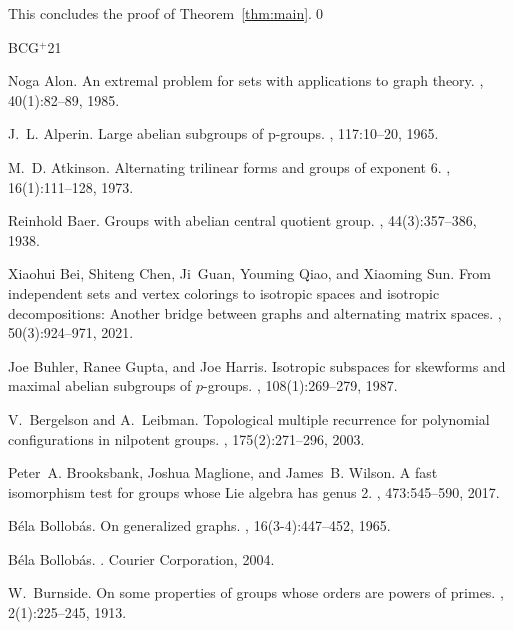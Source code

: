 \documentclass[10pt]{article}
\newcommand{\etalchar}[1]{$^{#1}$}
\begin{document}
This 
concludes the proof of Theorem~\ref{thm:main}.\hfill\qed
\begin{thebibliography}{BCG{\etalchar{+}}21}
%

Noga Alon.
\newblock An extremal problem for sets with applications to graph theory.
, 40(1):82--89, 1985.

J.~L. Alperin.
\newblock Large abelian subgroups of p-groups.
, 117:10--20,
  1965.

M.~D. Atkinson.
\newblock Alternating trilinear forms and groups of exponent 6.
, 16(1):111--128,
  1973.

Reinhold Baer.
\newblock Groups with abelian central quotient group.
,
  44(3):357--386, 1938.

\bibitem[BCG{\etalchar{+}}21]{BCG+19}
Xiaohui Bei, Shiteng Chen, Ji~Guan, Youming Qiao, and Xiaoming Sun.
\newblock From independent sets and vertex colorings to isotropic spaces and
  isotropic decompositions: Another bridge between graphs and alternating
  matrix spaces.
, 50(3):924--971, 2021.

Joe Buhler, Ranee Gupta, and Joe Harris.
\newblock Isotropic subspaces for skewforms and maximal abelian subgroups of
  $p$-groups.
, 108(1):269--279, 1987.

V.~Bergelson and A.~Leibman.
\newblock Topological multiple recurrence for polynomial configurations in
  nilpotent groups.
, 175(2):271--296, 2003.

Peter~A. Brooksbank, Joshua Maglione, and James~B. Wilson.
\newblock A fast isomorphism test for groups whose {Lie} algebra has genus 2.
, 473:545--590, 2017.

B{\'e}la Bollob{\'a}s.
\newblock On generalized graphs.
,
  16(3-4):447--452, 1965.

B{\'e}la Bollob{\'a}s.
.
\newblock Courier Corporation, 2004.

W.~Burnside.
\newblock On some properties of groups whose orders are powers of primes.
, 2(1):225--245,
  1913.


\end{thebibliography}
\end{document}
